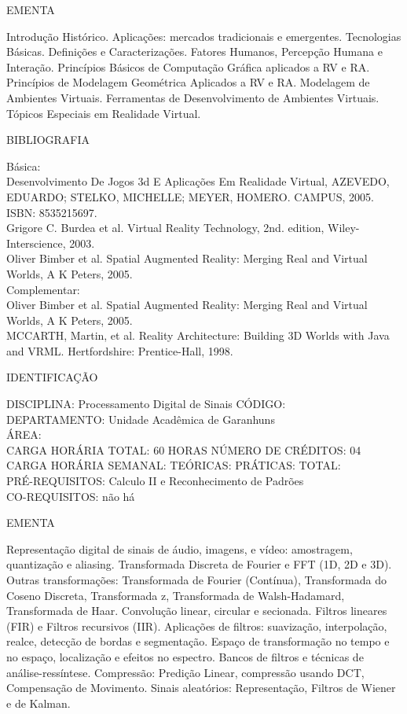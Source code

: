 \documentclass[
	12pt,				%
	openright,			%
  oneside,     %
	a4paper,			%
	english,			%
	french,				%
	spanish,			%
	brazil				%
	]{abntex2}
\begin{document}
\begin{apendicesenv}
EMENTA 

Introdução  Histórico. Aplicações: mercados tradicionais e
emergentes. Tecnologias Básicas. Definições e Caracterizações. Fatores
Humanos, Percepção Humana e Interação. Princípios Básicos de Computação
Gráfica aplicados a RV e RA. Princípios de Modelagem Geométrica
Aplicados a RV e RA. Modelagem de Ambientes Virtuais. Ferramentas de
Desenvolvimento de Ambientes Virtuais. Tópicos Especiais em Realidade
Virtual.

BIBLIOGRAFIA 

Básica:\\
Desenvolvimento De Jogos 3d E Aplicações Em Realidade Virtual, AZEVEDO,
EDUARDO; STELKO, MICHELLE; MEYER, HOMERO. CAMPUS, 2005. ISBN:
8535215697.\\
Grigore C. Burdea et al. Virtual Reality Technology, 2nd. edition,
Wiley-Interscience, 2003.\\
Oliver Bimber et al. Spatial Augmented Reality: Merging Real and Virtual
Worlds, A K Peters, 2005.\\
Complementar:\\
Oliver Bimber et al. Spatial Augmented Reality: Merging Real and Virtual
Worlds, A K Peters, 2005.\\
MCCARTH, Martin, et al. Reality Architecture: Building 3D Worlds with
Java and VRML. Hertfordshire: Prentice-Hall, 1998.

\newpage IDENTIFICAÇÃO

DISCIPLINA: Processamento Digital de Sinais CÓDIGO:\\
DEPARTAMENTO: Unidade Acadêmica de Garanhuns\\
ÁREA:\\
CARGA HORÁRIA TOTAL: 60 HORAS NÚMERO DE CRÉDITOS: 04\\
CARGA HORÁRIA SEMANAL: TEÓRICAS: PRÁTICAS: TOTAL:\\
PRÉ-REQUISITOS: Calculo II e Reconhecimento de Padrões\\
CO-REQUISITOS: não há

EMENTA 

Representação digital de sinais de áudio, imagens, e vídeo: amostragem,
quantização e  aliasing. Transformada Discreta de Fourier e FFT (1D, 2D e 3D). Outras
transformações: Transformada de Fourier (Contínua), Transformada do
Coseno Discreta, Transformada z, Transformada de Walsh-Hadamard,
Transformada de Haar. Convolução linear, circular e secionada. Filtros
lineares (FIR) e Filtros recursivos (IIR). Aplicações de filtros:
suavização, interpolação, realce, detecção de bordas e segmentação.
Espaço de transformação no tempo e no espaço, localização e efeitos no
espectro. Bancos de filtros e técnicas de análise-ressíntese.
Compressão: Predição Linear, compressão usando DCT, Compensação de
Movimento. Sinais aleatórios: Representação, Filtros de Wiener e de
Kalman.


\end{apendicesenv}
\end{document}
